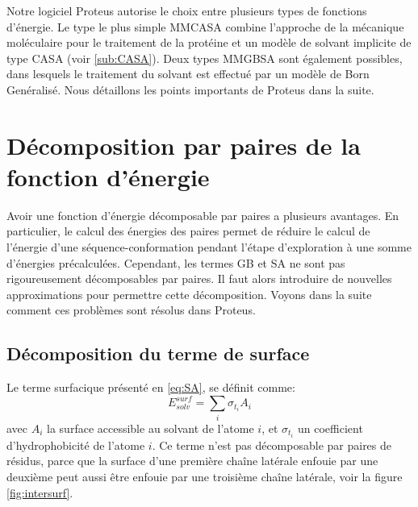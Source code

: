 Notre logiciel Proteus autorise le choix entre plusieurs types de fonctions d'énergie. Le type le plus simple \og MMCASA \fg combine l'approche de la mécanique moléculaire pour le traitement de la protéine et un modèle de solvant implicite de type CASA (voir  \vref{sub:CASA}). Deux types \og MMGBSA \fg sont également possibles, dans lesquels le traitement du solvant est effectué par un modèle de Born Genéralisé. Nous détaillons les points importants de Proteus dans la suite.

\section{Décomposition par paires de la fonction d'énergie}
Avoir une fonction d'énergie décomposable par paires a plusieurs avantages. En particulier, le calcul des énergies des paires permet de réduire le calcul de l'énergie d'une séquence-conformation pendant l'étape d'exploration à une somme d'énergies précalculées. Cependant, les termes GB et SA ne sont pas rigoureusement décomposables par paires. Il faut alors introduire de nouvelles approximations pour permettre cette décomposition. Voyons dans la suite comment ces problèmes sont résolus dans Proteus.
\subsection{Décomposition du terme de surface}
\label{sub:surpairwise}

Le terme surfacique présenté en \vref{eq:SA}, se définit comme:
\begin{equation}
E_{solv}^{surf} = \sum_i \sigma_{t_i} A_i 
\end{equation}
avec $A_i$ la surface accessible au solvant de l'atome $i$, et $\sigma_{t_i}$ un coefficient d'hydrophobicité de l'atome $i$.
Ce terme n'est pas décomposable par paires de résidus, parce que la surface d'une première chaîne latérale enfouie par une deuxième peut aussi être enfouie par une troisième chaîne latérale, voir la figure \ref{fig:intersurf}.


